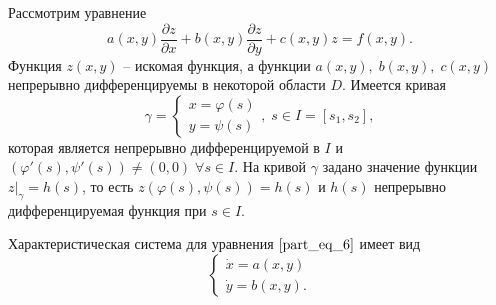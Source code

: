Рассмотрим уравнение
\begin{equation}
a(x, y) \frac{\partial z}{\partial x} + b(x, y) \frac{\partial z}{\partial y} + c(x, y) z = f(x, y).
\label{part_eq_6}
\end{equation}
Функция $z(x, y)$ -- искомая функция, а функции $a(x, y), \; b(x, y), \; c(x, y)$ непрерывно дифференцируемы в некоторой области $D$. Имеется кривая 
\begin{equation*}
\gamma = 
\begin{cases}
    x = \varphi(s) \\
    y = \psi(s)
\end{cases}, \; s \in I = [s_1, s_2],
\end{equation*}
которая является непрерывно дифференцируемой в $I$ и $(\varphi'(s), \psi'(s)) \neq (0, 0) \; \forall s \in I$. На кривой $\gamma$ задано значение функции $z \big|_{\gamma} = h(s)$, то есть $z(\varphi(s), \psi(s)) = h(s)$ и $h(s)$ непрерывно дифференцируемая функция при $s \in I$.

Характеристическая система для уравнения $\eqref{part_eq_6}$ имеет вид
\begin{equation}
    \begin{cases}
        \dot{x} = a(x, y) \\
        \dot{y} = b(x, y).
    \end{cases}
    \label{part_eq_7}
\end{equation}

